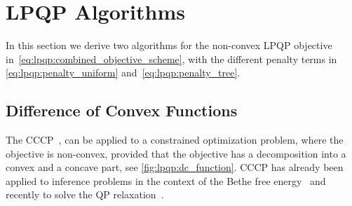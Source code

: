 \section{LPQP Algorithms}

In this section we derive two algorithms for the non-convex \ac{LPQP}
objective in~\eqref{eq:lpqp:combined_objective_scheme}, with the different penalty terms in
\eqref{eq:lpqp:penalty_uniform} and~\eqref{eq:lpqp:penalty_tree}. 


\subsection{Difference of Convex Functions}
\label{sec:lpqp:cccp}

The \acf{CCCP}~\parencite{Yuille2003}, can be applied to a 
constrained optimization
problem, where the objective is non-convex, provided that the objective has a
decomposition into a convex and a concave part, see
\autoref{fig:lpqp:dc_function}. \ac{CCCP} has already been applied to
inference problems in the context of the Bethe free
energy~\parencite{Yuille2002} and recently to solve the \ac{QP}
relaxation~\parencite{Kumar2011,Kumar2012,Kappes2008}.
